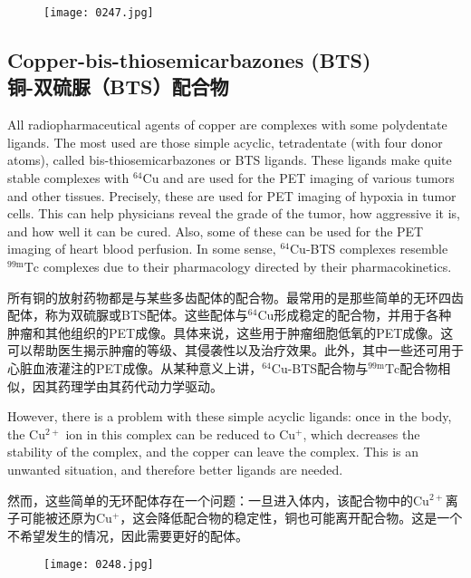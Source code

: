 \documentclass[dvipsnames, svgnames,a4paper,11pt]{article}
\begin{document}
\begin{figure}[h]
	\centering
    \texttt{[image: 0247.jpg]}  
     \label{fig330}
\end{figure}

\subsection{Copper-bis-thiosemicarbazones (BTS) \\铜-双硫脲（BTS）配合物}  
All radiopharmaceutical agents of copper are complexes with some polydentate ligands. The most used are those simple acyclic, tetradentate (with four donor atoms), called bis-thiosemicarbazones or BTS ligands. These ligands make quite stable complexes with \(\mathrm{^{64}Cu}\) and are used for the PET imaging of various tumors and other tissues. Precisely, these are used for PET imaging of hypoxia in tumor cells. This can help physicians reveal the grade of the tumor, how aggressive it is, and how well it can be cured. Also, some of these can be used for the PET imaging of heart blood perfusion. In some sense, \(\mathrm{^{64}Cu}\)-BTS complexes resemble \(\mathrm{^{99m}Tc}\) complexes due to their pharmacology directed by their pharmacokinetics.

所有铜的放射药物都是与某些多齿配体的配合物。最常用的是那些简单的无环四齿配体，称为双硫脲或BTS配体。这些配体与\(\mathrm{^{64}Cu}\)形成稳定的配合物，并用于各种肿瘤和其他组织的PET成像。具体来说，这些用于肿瘤细胞低氧的PET成像。这可以帮助医生揭示肿瘤的等级、其侵袭性以及治疗效果。此外，其中一些还可用于心脏血液灌注的PET成像。从某种意义上讲，\(\mathrm{^{64}Cu}\)-BTS配合物与\(\mathrm{^{99m}Tc}\)配合物相似，因其药理学由其药代动力学驱动。

However, there is a problem with these simple acyclic ligands: once in the body, the \(\mathrm{Cu^{2+}}\) ion in this complex can be reduced to \(\mathrm{Cu^+}\), which decreases the stability of the complex, and the copper can leave the complex. This is an unwanted situation, and therefore better ligands are needed.

然而，这些简单的无环配体存在一个问题：一旦进入体内，该配合物中的\(\mathrm{Cu^{2+}}\)离子可能被还原为\(\mathrm{Cu^+}\)，这会降低配合物的稳定性，铜也可能离开配合物。这是一个不希望发生的情况，因此需要更好的配体。

\begin{figure}[h]
	\centering
    \texttt{[image: 0248.jpg]}  
     \label{fig331}
\end{figure}
\end{document}
